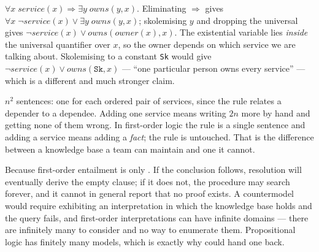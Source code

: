 \begin{ans}
  \item $\forall x \; \mathit{service}(x) \Rightarrow \exists y \;
        \mathit{owns}(y, x)$. Eliminating $\Rightarrow$ gives
        $\forall x \; \neg\mathit{service}(x) \vee \exists y \;
        \mathit{owns}(y,x)$; skolemising $y$ and dropping the universal gives
        $\neg\mathit{service}(x) \vee \mathit{owns}(\mathit{owner}(x), x)$.
        The existential variable lies \emph{inside} the universal quantifier over
        $x$, so the owner depends on which service we are talking about. Skolemising
        to a constant \texttt{Sk} would give
        $\neg\mathit{service}(x) \vee \mathit{owns}(\texttt{Sk}, x)$ --- ``one
        particular person owns every service'' --- which is a different and much
        stronger claim.
  \item $n^{2}$ sentences: one for each ordered pair of services, since the rule
        relates a depender to a dependee. Adding one service means writing $2n$ more
        by hand and getting none of them wrong. In first-order logic the rule is a
        single sentence and adding a service means adding a \emph{fact}; the rule is
        untouched. That is the difference between a knowledge base a team can
        maintain and one it cannot.
  \item Because first-order entailment is only . If the
        conclusion follows, resolution will eventually derive the empty clause; if
        it does not, the procedure may search forever, and it cannot in general
        report that no proof exists. A countermodel would require exhibiting an
        interpretation in which the knowledge base holds and the query fails, and
        first-order interpretations can have infinite domains --- there are
        infinitely many to consider and no way to enumerate them. Propositional
        logic has finitely many models, which is exactly why
         could hand one back.
\end{ans}

